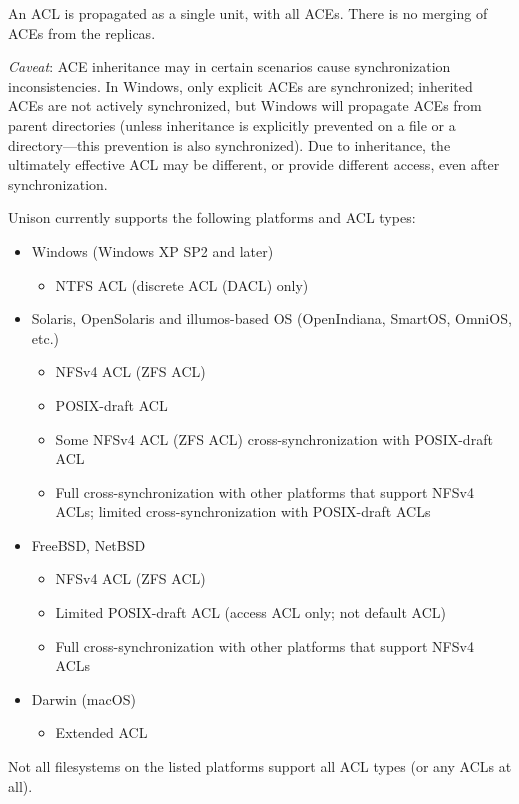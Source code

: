 \documentclass{article}
\begin{document}
An ACL is propagated as a single unit, with all ACEs. There is no
merging of ACEs from the replicas.

{\em Caveat}: ACE inheritance may in certain scenarios cause synchronization
inconsistencies. In Windows, only explicit ACEs are synchronized; inherited
ACEs are not actively synchronized, but Windows will propagate ACEs from parent
directories (unless inheritance is explicitly prevented on a file or a
directory---this prevention is also synchronized). Due to inheritance, the
ultimately effective ACL may be different, or provide different access, even
after synchronization.

Unison currently supports the following platforms and ACL types:
\begin{itemize}
  \item Windows (Windows XP SP2 and later)
  \begin{itemize}
    \item NTFS ACL (discrete ACL (DACL) only)
  \end{itemize}
\item Solaris, OpenSolaris and illumos-based OS (OpenIndiana, SmartOS,
  OmniOS, etc.)
  \begin{itemize}
  \item NFSv4 ACL (ZFS ACL)
  \item POSIX-draft ACL
  \item Some NFSv4 ACL (ZFS ACL) cross-synchronization with
  POSIX-draft ACL
  \item Full cross-synchronization with other platforms that support
  NFSv4 ACLs; limited cross-synchronization with POSIX-draft ACLs
  \end{itemize}
\item FreeBSD, NetBSD
  \begin{itemize}
  \item NFSv4 ACL (ZFS ACL)
  \item Limited POSIX-draft ACL (access ACL only; not default ACL)
  \item Full cross-synchronization with other platforms that support
  NFSv4 ACLs
  \end{itemize}
\item Darwin (macOS)
  \begin{itemize}
  \item Extended ACL
  \end{itemize}
\end{itemize}
Not all filesystems on the listed platforms support all ACL types
(or any ACLs at all).
\end{document}
